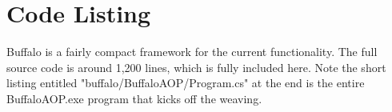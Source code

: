 \chapter{Code Listing}

Buffalo is a fairly compact framework for the current functionality. The full source code is around 1,200 lines, which is fully included here. Note the short listing entitled "buffalo/BuffaloAOP/Program.cs" at the end is the entire BuffaloAOP.exe program that kicks off the weaving.

\vspace{5mm}

